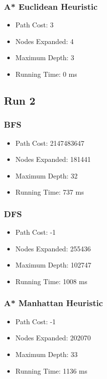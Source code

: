 \documentclass{article}
\begin{document}
		\subsubsection{A* Euclidean Heuristic}
			\begin{itemize}
				\item Path Cost: 3
				\item Nodes Expanded: 4
				\item Maximum Depth: 3
				\item Running Time: 0 ms
			\end{itemize}

	\subsection{Run 2}
		\begin{center}
		   \end{center}
		\subsubsection{BFS}
			\begin{itemize}
				\item Path Cost: 2147483647
				\item Nodes Expanded: 181441
				\item Maximum Depth: 32
				\item Running Time: 737 ms
			\end{itemize}
		\subsubsection{DFS}
			\begin{itemize}
				\item Path Cost: -1
				\item Nodes Expanded: 255436
				\item Maximum Depth: 102747
				\item Running Time: 1008 ms
			\end{itemize}	
		\subsubsection{A* Manhattan Heuristic}
			\begin{itemize}
				\item Path Cost: -1
				\item Nodes Expanded: 202070
				\item Maximum Depth: 33
				\item Running Time: 1136 ms
			\end{itemize}
\end{document}
